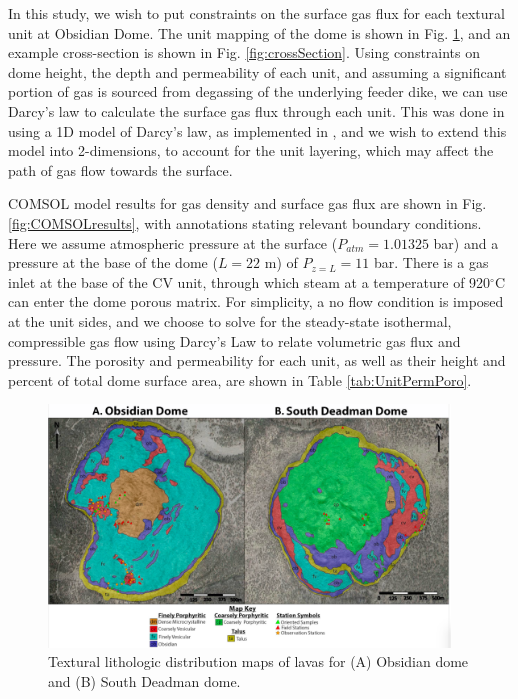 \documentclass[11pt]{amsart}
\begin{document}
In this study, we wish to put constraints on the surface gas flux for each textural unit at Obsidian Dome. The unit mapping of the dome is shown in Fig. \ref{fig:unitMapping}, and an example cross-section is shown in Fig. \ref{fig:crossSection}. Using constraints on dome height, the depth and permeability of each unit, and assuming a significant portion of gas is sourced from degassing of the underlying feeder dike, we can use Darcy's law to calculate the surface gas flux through each unit. This was done in \cite{Graham2023} using a 1D model of Darcy's law, as implemented in \cite{Edmonds2003}, and we wish to extend this model into 2-dimensions, to account for the unit layering, which may affect the path of gas flow towards the surface.

COMSOL model results for gas density and surface gas flux are shown in Fig. \ref{fig:COMSOLresults}, with annotations stating relevant boundary conditions. Here we assume atmospheric pressure at the surface ($P_{atm} = 1.01325$ bar) and a pressure at the base of the dome ($L=22$ m) of $P_{z=L} = 11$ bar. There is a gas inlet at the base of the CV unit, through which steam at a temperature of 920$^{\circ}$C can enter the dome porous matrix. For simplicity, a no flow condition is imposed at the unit sides, and we choose to solve for the steady-state isothermal, compressible gas flow using Darcy's Law to relate volumetric gas flux and pressure. The porosity and permeability for each unit, as well as their height and percent of total dome surface area, are shown in Table \ref{tab:UnitPermPoro}.

\begin{figure}
   \centering
\includegraphics[width=0.95\textwidth]{figs/unitMapping-small.png}
\caption{Textural lithologic distribution maps of lavas for (A) Obsidian dome and (B) South Deadman dome.}
\label{fig:unitMapping}
\end{figure}
\end{document}
